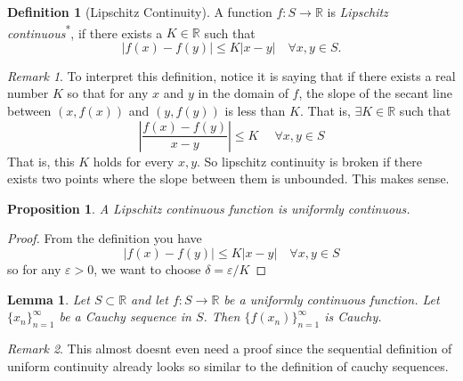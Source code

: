 \documentclass{article}
\newtheorem{lemma}{Lemma}[section]
\newtheorem{proposition}{Proposition}[section]
\theoremstyle{definition}
\newtheorem{definition}{Definition}[section]
\theoremstyle{remark}
\newtheorem{remark}{Remark}[section]
\begin{document}
\vspace{.5cm}

\begin{definition}[Lipschitz Continuity]\label{def:lipschitz continuous}
A function $f : S \to \mathbb{R}$ is \emph{Lipschitz continuous}\textsuperscript{*}, if there exists a $K \in \mathbb{R}$ such that
\[
|f(x) - f(y)| \leq K |x - y| \quad \forall x,y \in S.
\]
\end{definition}

\begin{remark}
To interpret this definition, notice it is saying that if there exists a real 
number $K$ so that for any $x$ and $y$ in the domain of $f$, the slope
of the secant line between $(x,f(x))$ and $(y,f(y))$ is less than $K$. That is, $\exists K \in \mathbb{R}$ such that 
\[
\left|\frac{f(x) - f(y)}{x-y} \right| \leq K \quad \; \forall x,y \in S
\]
That is, this $K$ holds for every $x,y$. So lipschitz continuity is broken
if there exists two points where the slope between them is unbounded. This makes sense. 
\end{remark}


\vspace{.5cm}



\begin{proposition}
A Lipschitz continuous function is uniformly continuous. 
\end{proposition}

\begin{proof}
From the definition you have 
\[
|f(x) - f(y)| \leq K |x - y| \quad \forall x,y \in S
\]
so for any $\varepsilon > 0$, we want to choose $\delta = \varepsilon / K$ 
\end{proof}








\vspace{.5cm}

\begin{lemma}
Let $S \subset \mathbb{R}$ and let $f : S \to \mathbb{R}$ be a uniformly continuous function. Let $\{x_n\}_{n=1}^{\infty}$ be a Cauchy sequence in $S$. Then $\{f(x_n)\}_{n=1}^{\infty}$ is Cauchy.
\end{lemma}

\begin{remark}
This almost doesnt even need a proof since the sequential definition of uniform continuity 
already looks so similar to the definition of cauchy sequences. 
\end{remark}
\end{document}
